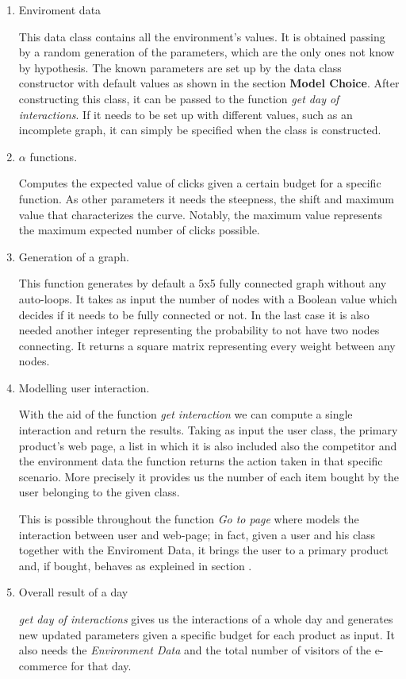  \begin{enumerate}
     \item Enviroment data
     
     This data class contains all the environment's values. It is obtained passing by a random generation of the parameters, which are the only ones not know by hypothesis. The known parameters are set up by the data class constructor with default values as shown in the section \textbf{Model Choice}. After constructing this class, it can be passed to the function  \textit{get day of interactions}. If it needs to be set up with different values, such as an incomplete graph, it can simply be specified when the class is constructed.
    
     \item $\alpha$ functions.
     
     Computes the expected value of clicks given a certain budget for a specific function. As other parameters it needs the steepness, the shift and maximum value that characterizes the curve. Notably, the maximum value represents the maximum expected number of clicks possible.
  
    \item Generation of a graph.
    
    This function generates by default a 5x5 fully connected graph without any auto-loops. It takes as input the number of nodes with a Boolean value which decides if it needs to be fully connected or not. In the last case it is also needed another integer representing the probability to not have two nodes connecting. It returns a square matrix representing every weight between any nodes.
   
    \item Modelling user interaction.
    
    With the aid of the function \textit{get interaction} we can compute a single interaction and return the results. Taking as input the user class, the primary product's web page, a list in which it is also included also the competitor and the environment data the function returns the action taken in that specific scenario. More precisely it provides us the number of each item bought by the user belonging to the given class.
    
    This is possible throughout the function \textit{Go to page} where models the interaction between user and web-page; in fact, given a user and his class together with the Enviroment Data, it brings the user to a primary product and, if bought, behaves as expleined in section .
    
    \item Overall result of a day
    
    \textit{get day of interactions} gives us the interactions of a whole day and generates new updated parameters given a specific budget for each product as input. It also needs the \textit{Environment Data} and the total number of visitors of the e-commerce for that day.
    
\end{enumerate}
